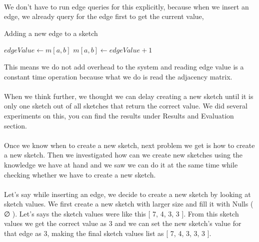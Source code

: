 \documentclass[12pt]{report}
\numberwithin{figure}{section}
\numberwithin{table}{section}
\begin{document}
\paragraph{}

We don't have to run edge queries for this explicitly, because when we insert an edge, we already query for the edge first to get the current value, 

\begin{algorithm}
\caption{Adding a new edge to a sketch}
\label{alg1}
\begin{algorithmic}
\STATE
\STATE $edgeValue \leftarrow m[a,b] $ 
\STATE $m[a,b] \leftarrow edgeValue + 1 $ 
\STATE
\end{algorithmic}
\end{algorithm}

This means we do not add overhead to the system and reading edge value is a constant time operation because what we do is read the adjacency matrix. 

\paragraph{}

When we think further, we thought we can delay creating a new sketch until it is only one sketch out of all sketches that return the correct value. We did several experiments on this, you can find the results under Results and Evaluation section.

\paragraph{}

Once we know when to create a new sketch, next problem we get is how to create a new sketch. Then we investigated how can we create new sketches using the knowledge we have at hand and we saw we can do it at the same time while checking whether we have to create a new sketch.

\paragraph{}

Let’s say while inserting an edge,  we decide to create a new sketch by looking at sketch values. We first create a new sketch with larger size and fill it with Nulls ( ∅ ). Let’s says  the sketch values were like this [ 7, 4, 3, 3 ]. From this sketch values we get the correct value as 3 and we can set the new sketch's value for that edge as 3, making the final sketch values list as  [ 7, 4, 3, 3, 3 ]. 
\end{document}
